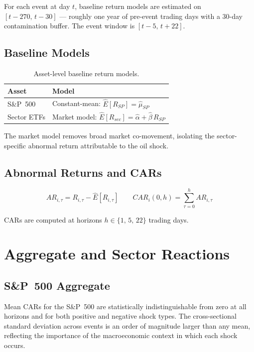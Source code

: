 \documentclass[11pt,a4paper]{article}
\begin{document}
For each event at day $t$, baseline return models are estimated on $[t-270,\, t-30]$ — roughly one year of pre-event trading days with a 30-day contamination buffer. The event window is $[t-5,\, t+22]$.

\subsection{Baseline Models}

\begin{table}[H]
\centering
\caption{Asset-level baseline return models.}
\begin{tabular}{ll}
\toprule
Asset & Model \\
\midrule
S\&P~500  & Constant-mean: $\hat{E}[R_{SP}] = \hat{\mu}_{SP}$ \\
Sector ETFs & Market model: $\hat{E}[R_{sec}] = \hat{\alpha} + \hat{\beta}\, R_{SP}$ \\
\bottomrule
\end{tabular}
\end{table}

The market model removes broad market co-movement, isolating the sector-specific abnormal return attributable to the oil shock.

\subsection{Abnormal Returns and CARs}

\[
AR_{i,\tau} = R_{i,\tau} - \hat{E}[R_{i,\tau}]
\qquad
CAR_i(0,h) = \sum_{\tau=0}^{h} AR_{i,\tau}
\]

CARs are computed at horizons $h \in \{1,\, 5,\, 22\}$ trading days.

\section{Aggregate and Sector Reactions}
\label{sec:sectors}

\subsection{S\&P~500 Aggregate}

Mean CARs for the S\&P~500 are statistically indistinguishable from zero at all horizons and for both positive and negative shock types. The cross-sectional standard deviation across events is an order of magnitude larger than any mean, reflecting the importance of the macroeconomic context in which each shock occurs.
\end{document}
